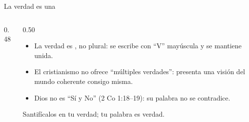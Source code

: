 \begin{frame}{La verdad es una}
\begin{columns}[c,onlytextwidth]
\begin{column}{0.48\textwidth}
\centering
{}
\end{column}
\begin{column}{0.50\textwidth}\small
\begin{itemize}
\item La verdad es , no plural: se escribe con ``V'' mayúscula y se mantiene unida.
\item El cristianismo no ofrece ``múltiples verdades'': presenta una visión del mundo coherente consigo misma.
\item Dios no es ``Sí y No'' (2 Co 1:18--19): su palabra no se contradice.
\end{itemize}
\begin{cita}Santifícalos en tu verdad; tu palabra es verdad.\end{cita}
\end{column}
\end{columns}
\end{frame}


